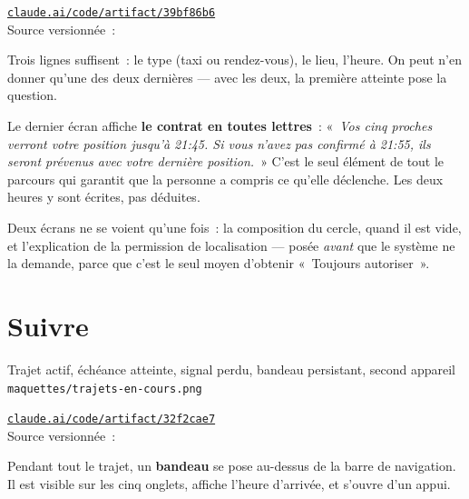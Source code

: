 \begin{note}
\href{https://claude.ai/code/artifact/39bf86b6-9506-4aba-937a-6ae051260766}%
{\texttt{claude.ai/code/artifact/39bf86b6}}\\
Source versionnée~: 
\end{note}

Trois lignes suffisent~: le type (taxi ou rendez-vous), le lieu, l'heure. On peut n'en
donner qu'une des deux dernières --- avec les deux, la première atteinte pose la question.

Le dernier écran affiche \textbf{le contrat en toutes lettres}~: «~\emph{Vos cinq proches
verront votre position jusqu'à 21:45. Si vous n'avez pas confirmé à 21:55, ils seront
prévenus avec votre dernière position.}~» C'est le seul élément de tout le parcours qui
garantit que la personne a compris ce qu'elle déclenche. Les deux heures y sont écrites, pas
déduites.

Deux écrans ne se voient qu'une fois~: la composition du cercle, quand il est vide, et
l'explication de la permission de localisation --- posée \emph{avant} que le système ne la
demande, parce que c'est le seul moyen d'obtenir «~Toujours autoriser~».

\section{Suivre}

\begin{center}
    {Trajet actif, échéance atteinte, signal perdu, bandeau persistant, second appareil\\
     \texttt{maquettes/trajets-en-cours.png}}
\end{center}

\begin{note}
\href{https://claude.ai/code/artifact/32f2cae7-c8db-4f8c-b85a-f3eb43e5d644}%
{\texttt{claude.ai/code/artifact/32f2cae7}}\\
Source versionnée~: 
\end{note}

Pendant tout le trajet, un \textbf{bandeau} se pose au-dessus de la barre de navigation. Il
est visible sur les cinq onglets, affiche l'heure d'arrivée, et s'ouvre d'un appui.

